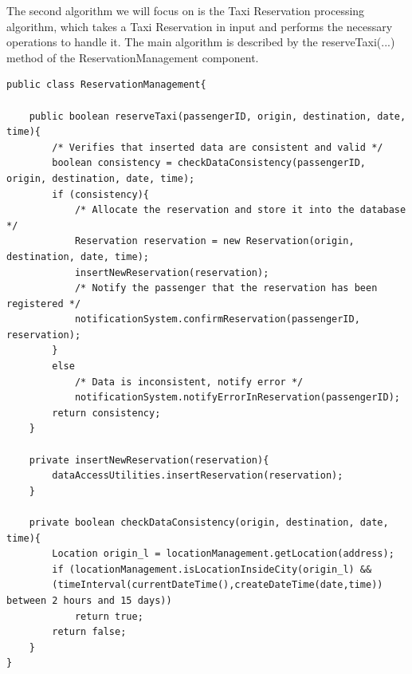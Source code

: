 The second algorithm we will focus on is the Taxi Reservation processing algorithm, which takes a Taxi Reservation in input and performs the necessary operations to handle it. The main algorithm is described by the reserveTaxi(...) method of the ReservationManagement component.

\begin{lstlisting}
public class ReservationManagement{

	public boolean reserveTaxi(passengerID, origin, destination, date, time){
		/* Verifies that inserted data are consistent and valid */
		boolean consistency = checkDataConsistency(passengerID, origin, destination, date, time);
		if (consistency){
			/* Allocate the reservation and store it into the database */
			Reservation reservation = new Reservation(origin, destination, date, time);
			insertNewReservation(reservation);
			/* Notify the passenger that the reservation has been registered */
			notificationSystem.confirmReservation(passengerID, reservation);
		}
		else
			/* Data is inconsistent, notify error */
			notificationSystem.notifyErrorInReservation(passengerID);
		return consistency;
	}
	
	private insertNewReservation(reservation){
		dataAccessUtilities.insertReservation(reservation);
	}
	
	private boolean checkDataConsistency(origin, destination, date, time){
		Location origin_l = locationManagement.getLocation(address);
		if (locationManagement.isLocationInsideCity(origin_l) && 
		(timeInterval(currentDateTime(),createDateTime(date,time)) between 2 hours and 15 days))
			return true;
		return false; 
	}
}	
\end{lstlisting}

